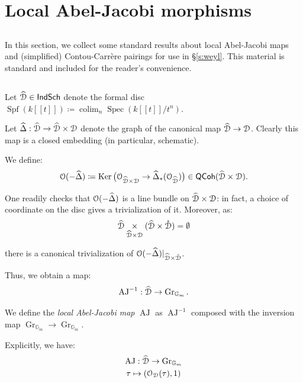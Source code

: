 \documentclass[reqno,11pt]{amsart}
\numberwithin{equation}{subsection}
\theoremstyle{remark}
\newcommand{\bG}{{\mathbb G}}
\newcommand{\sD}{{\EuScript D}}
\newcommand{\sO}{{\EuScript O}}
\newcommand{\on}{\operatorname}
\newcommand{\Ker}{\on{Ker}}
\newcommand{\Spec}{\on{Spec}}
\newcommand{\Spf}{\on{Spf}}
\newcommand{\Gr}{\on{Gr}}
\newcommand{\colim}{\on{colim}}
\newcommand{\QCoh}{\mathsf{QCoh}}
\newcommand{\IndSch}{\mathsf{IndSch}}
\newcommand{\AJ}{\on{AJ}}
\renewcommand{\o}[1]{\mathring{#1}}
\begin{document}
\section{Local Abel-Jacobi morphisms}\label{s:aj}

\subsection{}

In this section, we collect some standard results
about local Abel-Jacobi maps and (simplified) 
Contou-Carr\`ere pairings for use in \S \ref{s:weyl}.
This material is standard and included for the reader's
convenience.

\subsection{}

Let $\widehat{\sD} \in \IndSch$ denote the formal disc
$\Spf(k[[t]]) \coloneqq \colim_n \Spec(k[[t]]/t^n)$.

Let $\widehat{\Delta}:\widehat{\sD} \to \widehat{\sD} \times \sD$ denote the
graph of the canonical map $\widehat{\sD} \to \sD$. 
Clearly this map is a closed embedding (in particular, schematic).

We define: 
%
\[
\sO(-\widehat{\Delta}) \coloneqq \Ker\big(
\sO_{\widehat{\sD} \times \sD} \to \widehat{\Delta}_*(\sO_{\widehat{\sD}})\big) 
\in \QCoh(\widehat{\sD} \times \sD).
\]

\noindent One readily checks 
that $\sO(-\widehat{\Delta})$ is a line bundle on 
$\widehat{\sD} \times \sD$: in fact, 
a choice of coordinate on the disc 
gives a trivialization of it. 
Moreover, as:
%
\[
\widehat{\sD}
\underset{\widehat{\sD} \times \sD }{\times}
(\widehat{\sD} \times \o{\sD} ) = \emptyset
\]

\noindent there is a canonical trivialization
of 
$\sO(-\widehat{\Delta})|_{\widehat{\sD} \times \o{\sD}}$. 

Thus, we obtain a map:
%
\[
\AJ^{-1}:\widehat{\sD} \to \Gr_{\bG_m}.
\] 

\noindent We 
define the \emph{local Abel-Jacobi map} 
$\AJ$ as $\AJ^{-1}$ composed
with the inversion map $\Gr_{\bG_m} \to \Gr_{\bG_m}$.

Explicitly, we have:
%
\[
\begin{gathered}
\AJ: \widehat{\sD} \to \Gr_{\bG_m} \\
\tau \mapsto (\sO_{\sD}(\tau),1)
\end{gathered}
\]
\end{document}
